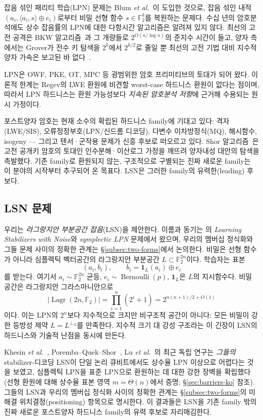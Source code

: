 \documentclass[11pt,a4paper]{article}
\theoremstyle{plain}
\theoremstyle{definition}
\newcommand{\F}{\mathbb{F}}
\DeclareMathOperator{\Lagr}{Lagr}
\newcommand{\etal}{\textit{et al.}}
\begin{document}
잡음 섞인 패리티 학습(LPN) 문제는 Blum \etal~\cite{BFKL94}이 도입한 것으로, 잡음 섞인 내적 $(a_i, \langle a_i, s\rangle \oplus e_i)$로부터 비밀 선형 함수 $s \in \F_2^k$를 복원하는 문제다. 수십 년의 암호분석에도 상수 잡음률의 LPN에 대한 다항시간 알고리즘은 알려져 있지 않다. 최선의 고전 공격은 BKW 알고리즘~\cite{BKW03}과 그 개량들로 $2^{O(n/\log n)}$의 준지수 시간이 들고, 양자 측에서는 Grover가 전수 키 탐색을 $2^k$에서 $2^{k/2}$로 줄일 뿐 최선의 고전 기법 대비 지수적 양자 가속은 보고된 바 없다~\cite{Kir11}.

LPN은 OWF, PKE, OT, MPC 등 광범위한 암호 프리미티브의 토대가 되어 왔다. 이론적 한계는 Regev의 LWE 환원에 비견할 worst-case 하드니스 환원이 없다는 점이며, 따라서 LPN 하드니스는 환원 가능성보다 \emph{지속된 암호분석 저항}에 근거해 수용되는 원시 가정이다.

포스트양자 암호는 현재 소수의 확립된 하드니스 family에 기대고 있다: 격자(LWE/SIS), 오류정정부호(LPN/신드롬 디코딩), 다변수 이차방정식(MQ), 해시함수, isogeny --- 그리고 텐서·군작용 문제가 신흥 후보로 떠오르고 있다. Shor 알고리즘~\cite{Sho94}은 고전 공개키 암호의 토대인 인수분해·이산로그 가정을 깨뜨려 양자내성 대안의 탐색을 촉발했다. 기존 family로 환원되지 않는, 구조적으로 구별되는 진짜 새로운 family는 이 분야의 시작부터 추구되어 온 목표다. LSN은 그러한 family의 유력한(leading) 후보다.

\subsection{LSN 문제}

우리는 \emph{라그랑지안 부분공간 잡음}(LSN)을 제안한다. 이름과 동기는 \cite{KLP+25,LPQR26}의 \emph{Learning Stabilizers with Noise}와 \emph{symplectic LPN} 문제에서 왔으며, 우리의 멤버십 정식화와 그들 문제 사이의 정확한 관계는 \S\ref{subsec:two-forms}에서 논의한다. 비밀은 선형 함수가 아니라 심플렉틱 벡터공간의 라그랑지안 부분공간 $L \subset \F_2^{2n}$이다. 학습자는 표본
\[
(a_i, b_i), \qquad b_i = \mathbf{1}_L(a_i) \oplus e_i
\]
를 받는다. 여기서 $a_i \sim \F_2^{2n}$ 균등, $e_i \sim \operatorname{Bernoulli}(p)$, $\mathbf{1}_L$은 $L$의 지시함수다. 비밀 공간은 라그랑지안 그라스마니안으로
\[
|\Lagr(2n,\F_2)| = \prod_{i=1}^n (2^i+1) = 2^{n(n+1)/2 + O(1)}
\]
이다. 이는 LPN의 $2^n$보다 지수적으로 크지만 비구조적 공간이 아니다: 모든 비밀이 강한 등방성 제약 $L = L^{\perp_\Omega}$를 만족한다. 지수적 크기 대 강성 구조라는 이 긴장이 LSN의 하드니스와 기술적 난점을 동시에 만든다.

Khesin \etal~\cite{KLP+25}, Poremba--Quek--Shor~\cite{PQS26}, Lu \etal~\cite{LPQR26}의 최근 독립 연구는 \emph{그들의} stabilizer-디코딩 LSN이 단일 논리 큐비트에서도 상수율 LPN 이상으로 어렵다는 것을 보였고, 심플렉틱 LPN을 표준 LPN으로 환원하는 데 대한 강한 장벽을 확립했다(선형 환원에 대해 상수율 표본 영역 $m=\Theta(n)$에서 증명; \S\ref{sec:barriers-ko} 참조). 그들의 LSN과 우리의 멤버십 정식화 사이의 정확한 관계는 \S\ref{subsec:two-forms}의 미해결 위치결정(positioning) 항목으로 명시한다. 이 결과들은 LSN을 기존 family 밖의 진짜 새로운 포스트양자 하드니스 family의 유력 후보로 자리매김한다.
\end{document}
